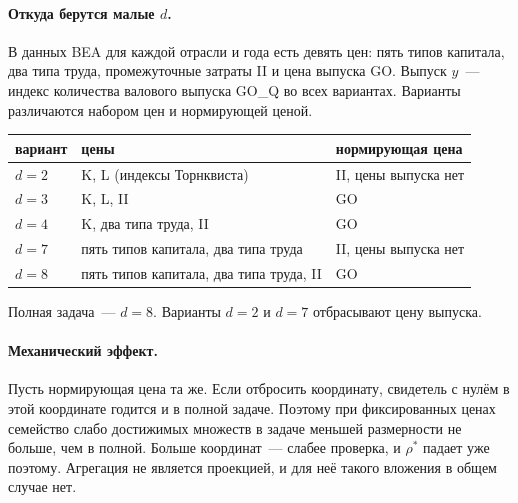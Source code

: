 \documentclass[a4paper,11pt]{article}
\theoremstyle{plain}
\theoremstyle{definition}
\theoremstyle{remark}
\begin{document}
\paragraph{Откуда берутся малые $d$.} В данных BEA для каждой отрасли и года есть девять цен: пять типов капитала, два типа труда, промежуточные затраты II и цена выпуска GO. Выпуск $y$~--- индекс количества валового выпуска GO\_Q во всех вариантах. Варианты различаются набором цен и нормирующей ценой.
\begin{center}
\begin{tabular}{lll}
    \toprule
    вариант & цены & нормирующая цена \\
    \midrule
    $d=2$ & K, L (индексы Торнквиста) & II, цены выпуска нет \\
    $d=3$ & K, L, II & GO \\
    $d=4$ & K, два типа труда, II & GO \\
    $d=7$ & пять типов капитала, два типа труда & II, цены выпуска нет \\
    $d=8$ & пять типов капитала, два типа труда, II & GO \\
    \bottomrule
\end{tabular}
\end{center}
Полная задача~--- $d=8$. Варианты $d=2$ и $d=7$ отбрасывают цену выпуска.

\paragraph{Механический эффект.} Пусть нормирующая цена та же. Если отбросить координату, свидетель с нулём в этой координате годится и в полной задаче. Поэтому при фиксированных ценах семейство слабо достижимых множеств в задаче меньшей размерности не больше, чем в полной. Больше координат~--- слабее проверка, и $\rho^*$ падает уже поэтому. Агрегация не является проекцией, и для неё такого вложения в общем случае нет.
\end{document}
